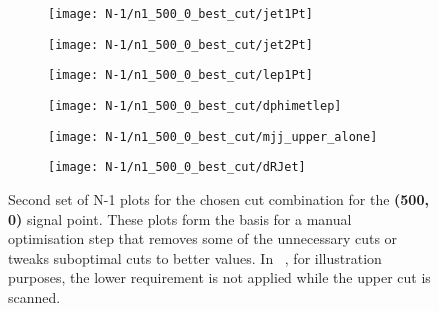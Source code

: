 \begin{figure}
	\centering
	\begin{subfigure}[b]{0.5\linewidth}
		\centering\texttt{[image: N-1/n1\_500\_0\_best\_cut/jet1Pt]}
		\caption{\label{fig:result_500_0_jet1Pt}}
	\end{subfigure}%
	\begin{subfigure}[b]{0.5\linewidth}
		\centering\texttt{[image: N-1/n1\_500\_0\_best\_cut/jet2Pt]}
		\caption{\label{fig:result_500_0_jet2Pt}}
	\end{subfigure}	
	\begin{subfigure}[b]{0.5\linewidth}
		\centering\texttt{[image: N-1/n1\_500\_0\_best\_cut/lep1Pt]}
		\caption{\label{fig:result_500_0_lep1Pt}}
	\end{subfigure}%
	\begin{subfigure}[b]{0.5\linewidth}
		\centering\texttt{[image: N-1/n1\_500\_0\_best\_cut/dphimetlep]}
		\caption{\label{fig:result_500_0_dphimetlep}}
	\end{subfigure}
	\begin{subfigure}[b]{0.5\linewidth}
		\centering\texttt{[image: N-1/n1\_500\_0\_best\_cut/mjj\_upper\_alone]}
		\caption{\label{fig:result_500_0_mjj_upper}}
	\end{subfigure}%
	\begin{subfigure}[b]{0.5\linewidth}
		\centering\texttt{[image: N-1/n1\_500\_0\_best\_cut/dRJet]}
		\caption{\label{fig:result_500_0_dRJet}}
	\end{subfigure}
	\caption[N-1 plots for the chosen cut combination for the (500,0) signal point, 2/2]{Second set of N-1 plots for the chosen cut combination for the \textbf{(500, 0)} signal point. These plots form the basis for a manual optimisation step that removes some of the unnecessary cuts or tweaks suboptimal cuts to better values. In \figname~, for illustration purposes, the lower requirement is not applied while the upper cut is scanned.}
	\label{fig:results_500_0_n-1}
\end{figure}